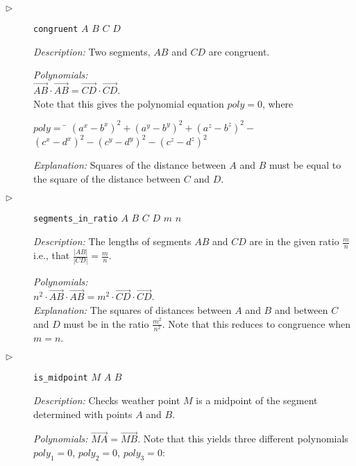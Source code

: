 \documentclass[final,1p,times,authoryear]{elsarticle}
\begin{document}
\begin{description}
\item[$\triangleright$] {\tt congruent} $A$ $B$ $C$ $D$

  {\em Description:} Two segments, $AB$ and $CD$ are
  congruent.


{\em Polynomials:} \\
$\overrightarrow{AB} \cdot \overrightarrow{AB} = \overrightarrow{CD} \cdot \overrightarrow{CD}$. \\
Note that this gives the polynomial equation $poly = 0$, where

\begin{tabbing}
$poly = $ \= $({a^x} - {b^x})^2 + ({a^y} - {b^y})^2 + ({a^z} - {b^z})^2 -$ \\ 
          \> $({c^x} - {d^x})^2 - ({c^y} - {d^y})^2 - ({c^z} - {d^z})^2$
\end{tabbing}

{\em Explanation:} Squares of the distance between $A$ and $B$ must be
equal to the square of the distance between $C$ and $D$.

\item[$\triangleright$] {\tt segments\_in\_ratio} $A$ $B$ $C$ $D$
  $m$ $n$ 

  {\em Description:} The lengths of segments $AB$ and
  $CD$ are in the given ratio $\frac{m}{n}$ i.e., that
  $\frac{|AB|}{|CD|} = \frac{m}{n}$.

{\em Polynomials:} \\
$n^2 \cdot \overrightarrow{AB} \cdot \overrightarrow{AB} = m^2 \cdot \overrightarrow{CD} \cdot \overrightarrow{CD}$. \\


{\em Explanation:} The squares of distances between $A$ and $B$ and
between $C$ and $D$ must be in the ratio $\frac{m^2}{n^2}$. Note that
this reduces to congruence when $m = n$.

\item[$\triangleright$] {\tt is\_midpoint} $M$ $A$ $B$

{\em Description:} Checks weather point $M$ is a midpoint of the
segment determined with points $A$ and $B$.

{\em Polynomials:} $\overrightarrow{MA} = \overrightarrow{MB}$.  Note
that this yields three different polynomials $poly_1 = 0$,
$poly_2 = 0$, $poly_3 = 0$:


\end{description}
\end{document}
